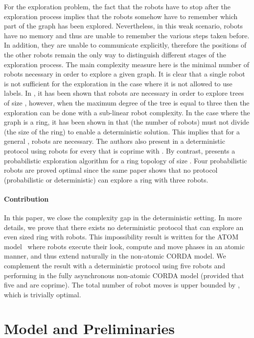 \documentclass[12pt]{llncs}
\begin{document}
For the exploration problem, the fact that the robots have to stop after the exploration process implies that the robots somehow have to remember which part of the graph has been explored. Nevertheless, in this weak scenario, robots have no memory and thus are unable to remember the various steps taken before. In addition, they are unable to communicate explicitly, therefore the positions of the other robots remain the only way to distinguish different stages of the exploration process. The main complexity measure here is the minimal number of robots necessary in order to explore a given graph. It is clear that a single robot is not sufficient for the exploration in the case where it is not allowed to use labels. In \cite{davi08}, it has been shown that  robots are necessary in order to explore trees of size , however, when the maximum degree of the tree is equal to three then the exploration can be done with a sub-linear robot complexity. In the case where the graph is a ring, it has been shown in \cite{davi07} that  (the number of robots) must not divide  (the size of the ring) to enable a deterministic solution. This implies that for a general ,  robots are necessary. The authors also present in \cite{davi07} a deterministic protocol using  robots for every  that is coprime with . By contrast, \cite{stap09} presents a probabilistic exploration algorithm for a ring topology of size . Four probabilistic robots are proved optimal since the same paper shows that no protocol (probabilistic or deterministic) can explore a ring with three robots.

\paragraph{\textbf{Contribution}}\label{sec:Contribution}

In this paper, we close the complexity gap in the deterministic setting. In more details, we prove that there exists no deterministic protocol that can explore an even sized ring with  robots. This impossibility result is written for the ATOM model~\cite{yama99} where robots execute their look, compute and move phases in an atomic manner, and thus extend naturally in the non-atomic CORDA model. We complement the result with a deterministic protocol using five robots and performing in the fully asynchronous non-atomic CORDA model \cite{Pre01} (provided that five and  are coprime). The total number of robot moves is upper bounded by , which is trivially optimal. 

\section{Model and Preliminaries}\label{sec:Model}
\end{document}
